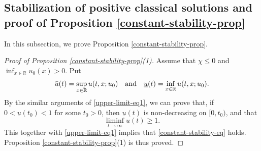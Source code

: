 \documentclass[11pt]{article} %
\theoremstyle{remark}
\theoremstyle{remark}
\numberwithin{equation}{section}
\numberwithin{figure}{section}
\numberwithin{table}{section}
\newcommand\RR{\ensuremath{\mathbb{R}}}
\begin{document}
\subsection{Stabilization of positive classical solutions and proof of Proposition \ref{constant-stability-prop}}

In this subsection, we prove Proposition \ref{constant-stability-prop}.


\begin{proof}[Proof of Proposition \ref{constant-stability-prop}(1)]


Assume that $\chi\le 0$ and $\inf_{x\in\mathbb{R}} u_0(x)>0$.
 Put
$$
\bar u(t)=\sup_{x\in\RR} u(t,x;u_0)\quad {\rm and}\quad \underline u(t)=\inf_{x\in\RR} u(t,x;u_0).
$$
By the similar  arguments of \eqref{upper-limit-eq1},  we can prove that,  if $0<\underline u(t_0)<1$ for some $t_0>0$, then
$\underline u(t)$ is non-decreasing on $[0,t_0)$, and that
$$
\liminf_{t\to\infty} \underline u(t)\ge 1.
$$
This together with \eqref{upper-limit-eq1} implies that \eqref{constant-stability-eq} holds.
Proposition \ref{constant-stability-prop}(1) is thus proved.
\end{proof}
\end{document}
